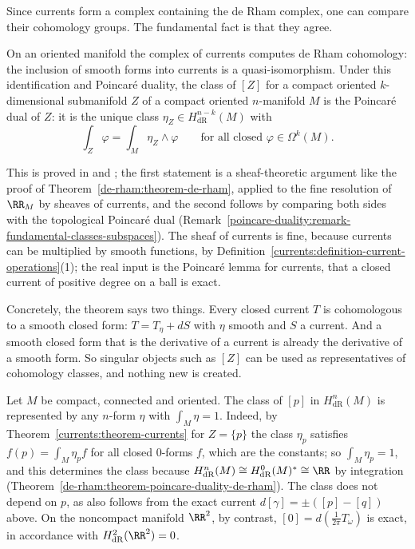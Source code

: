 Since currents form a complex containing the de Rham complex, one can compare their cohomology groups. The fundamental fact is that they agree.

\begin{theorem}\label{currents:theorem-currents}
On an oriented manifold the complex of currents computes de Rham cohomology: the inclusion of smooth forms into currents is a quasi-isomorphism. Under this identification and Poincar\'e duality, the class
of $[Z]$ for a compact oriented $k$-dimensional submanifold $Z$ of a compact oriented $n$-manifold $M$ is the Poincar\'e dual of $Z$: it is the unique class $\eta_Z \in H^{n-k}_{\mathrm{dR}}(M)$ with
\[
\int_Z\varphi = \int_M\eta_Z \wedge \varphi \qquad \text{for all closed } \varphi \in \Omega^k(M).
\]
\end{theorem}

This is proved in \cite[Chapter IV]{de-rham-book} and \cite[Chapter 0, Section 4]{griffiths-harris}; the first statement is a sheaf-theoretic argument like the proof of
Theorem~\ref{de-rham:theorem-de-rham}, applied to the fine resolution of $\RR_M$ by sheaves of currents, and the second follows by comparing both sides with the topological Poincar\'e dual
(Remark~\ref{poincare-duality:remark-fundamental-classes-subspaces}). The sheaf of currents is fine, because currents can be multiplied by smooth functions, by
Definition~\ref{currents:definition-current-operations}(1); the real input is the Poincar\'e lemma for currents, that a closed current of positive degree on a ball is exact.

Concretely, the theorem says two things. Every closed current $T$ is cohomologous to a smooth closed form: $T = T_\eta + dS$ with $\eta$ smooth and $S$ a current. And a smooth closed form that is
the derivative of a current is already the derivative of a smooth form. So singular objects such as $[Z]$ can be used as representatives of cohomology classes, and nothing new is created.

\begin{example}\label{currents:example-point-class}
Let $M$ be compact, connected and oriented. The class of $[p]$ in $H^n_{\mathrm{dR}}(M)$ is represented by any $n$-form $\eta$ with $\int_M\eta = 1$. Indeed, by Theorem~\ref{currents:theorem-currents} for
$Z = \{p\}$ the class $\eta_p$ satisfies $f(p) = \int_M\eta_p f$ for all closed $0$-forms $f$, which are the constants; so $\int_M\eta_p = 1$, and this determines the class because
$H^n_{\mathrm{dR}}(M) \cong H^0_{\mathrm{dR}}(M)^* \cong \RR$ by integration (Theorem~\ref{de-rham:theorem-poincare-duality-de-rham}). The class does not depend on $p$, as also follows from the exact
current $d[\gamma] = \pm([p] - [q])$ above. On the noncompact manifold $\RR^2$, by contrast, $[0] = d(\frac{1}{2\pi}T_\omega)$ is exact, in accordance with $H^2_{\mathrm{dR}}(\RR^2) = 0$.
\end{example}

